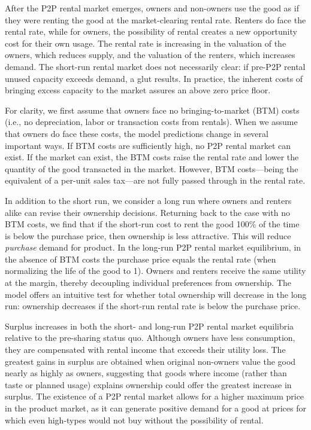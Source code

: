 \documentclass[11pt]{article}
\begin{document}
After the P2P rental market emerges, owners and non-owners use the good as if they were renting the good at the market-clearing rental rate. 
Renters do face the rental rate, while for owners, the possibility of rental creates a new opportunity cost for their own usage. 
The rental rate is increasing in the valuation of the owners, which reduces supply, and the valuation of the renters, which increases demand. 
The short-run rental market does not necessarily clear: if pre-P2P rental unused capacity exceeds demand, a glut results. 
In practice, the inherent costs of bringing excess capacity to the market assures an above zero price floor.

For clarity, we first assume that owners face no bringing-to-market (BTM) costs (i.e., no depreciation, labor or transaction costs from rentals).
When we assume that owners do face these costs, the model predictions change in several important ways.
If BTM costs are sufficiently high, no P2P rental market can exist.
If the market can exist, the BTM costs raise the rental rate and lower the quantity of the good transacted in the market.
However, BTM costs---being the equivalent of a per-unit sales tax---are not fully passed through in the rental rate.

In addition to the short run, we consider a long run where owners and renters alike can revise their ownership decisions.
Returning back to the case with no BTM costs, we find that if the short-run cost to rent the good 100\% of the time is below the purchase price, then ownership is less attractive.
This will reduce \emph{purchase} demand for product.
In the long-run P2P rental market equilibrium, in the absence of BTM costs the purchase price equals the rental rate (when normalizing the life of the good to 1).
Owners and renters receive the same utility at the margin, thereby decoupling individual preferences from ownership. 
The model offers an intuitive test for whether total ownership will decrease in the long run:
ownership decreases if the short-run rental rate is below the purchase price. 

Surplus increases in both the short- and long-run P2P rental market equilibria relative to the pre-sharing status quo.
Although owners have less consumption, they are compensated with rental income that exceeds their utility loss. 
The greatest gains in surplus are obtained when original non-owners value the good nearly as highly as owners, suggesting that goods where income (rather than taste or planned usage) explains ownership could offer the greatest increase in surplus. 
The existence of a P2P rental market allows for a higher maximum price in the product market, as it can generate positive demand for a good at prices for which even high-types would not buy without the possibility of rental. 
\end{document}
